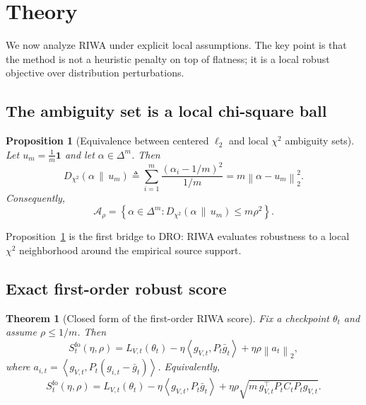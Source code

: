 \documentclass{article}
\newtheorem{theorem}{Theorem}
\newtheorem{proposition}{Proposition}
\newcommand{\riwa}{\textup{\textsc{RIWA}}}
\newcommand{\simplex}{\Delta}
\newcommand{\norm}[1]{\left\lVert #1 \right\rVert}
\newcommand{\inner}[2]{\left\langle #1, #2 \right\rangle}
\begin{document}
\section{Theory}
\label{sec:theory}

We now analyze \riwa{} under explicit local assumptions. The key point is that the method is not a heuristic penalty on top of flatness; it is a local robust objective over distribution perturbations.

\subsection{The ambiguity set is a local chi-square ball}

\begin{proposition}[Equivalence between centered $\ell_2$ and local $\chi^2$ ambiguity sets]
\label{prop:chisq}
Let $u_m = \frac{1}{m}\mathbf{1}$ and let $\alpha \in \simplex^m$. Then
\begin{equation}
    D_{\chi^2}(\alpha \,\|\, u_m)
    \triangleq
    \sum_{i=1}^{m}\frac{(\alpha_i - 1/m)^2}{1/m}
    =
    m \norm{\alpha - u_m}_2^2.
\end{equation}
Consequently,
\begin{equation}
    \mathcal{A}_{\rho}
    =
    \left\{
    \alpha \in \simplex^m :
    D_{\chi^2}(\alpha \,\|\, u_m) \le m\rho^2
    \right\}.
\end{equation}
\end{proposition}

Proposition~\ref{prop:chisq} is the first bridge to DRO: \riwa{} evaluates robustness to a local $\chi^2$ neighborhood around the empirical source support.

\subsection{Exact first-order robust score}

\begin{theorem}[Closed form of the first-order \riwa{} score]
\label{thm:support}
Fix a checkpoint $\theta_t$ and assume $\rho \le 1/m$. Then
\begin{equation}
    S_t^{\mathrm{fo}}(\eta,\rho)
    =
    L_{V,t}(\theta_t)
    -
    \eta \inner{g_{V,t}}{P_t \bar g_t}
    +
    \eta \rho \norm{a_t}_2,
\end{equation}
where $a_{i,t} = \inner{g_{V,t}}{P_t(g_{i,t}-\bar g_t)}$. Equivalently,
\begin{equation}
    S_t^{\mathrm{fo}}(\eta,\rho)
    =
    L_{V,t}(\theta_t)
    -
    \eta \inner{g_{V,t}}{P_t \bar g_t}
    +
    \eta \rho \sqrt{m\, g_{V,t}^\top P_t C_t P_t g_{V,t}}.
\end{equation}
\end{theorem}
\end{document}
